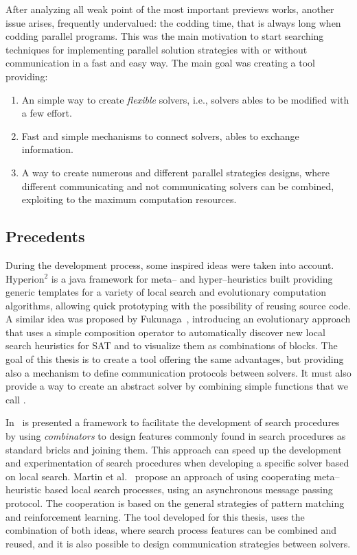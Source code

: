 After analyzing all weak point of the most important previews works, another issue arises, frequently undervalued: the codding time, that is always long when codding parallel programs. This was the main motivation to start searching techniques for implementing parallel solution strategies with or without communication in a fast and easy way. The main goal was creating a tool providing:
\begin{enumerate}
\item An simple way to create \textit{flexible} solvers, i.e., solvers ables to be modified with a few effort.
\item Fast and simple mechanisms to connect solvers, ables to exchange information.
\item A way to create numerous and different parallel strategies designs, where different communicating and not communicating solvers can be combined, exploiting to the maximum computation resources. 
\end{enumerate}

\subsection{Precedents}

During the development process, some inspired ideas were taken into account. {\sc Hyperion}$^2$ \cite{Brownlee2014} is a java framework for meta-- and hyper--heuristics built providing generic templates for a variety of local search and evolutionary computation algorithms, allowing quick prototyping with the possibility of reusing source code. A similar idea was proposed by Fukunaga~\cite{Fukunaga2008}, introducing an evolutionary approach that uses a simple composition operator to automatically discover new local search heuristics for SAT and to visualize them as combinations of blocks. The goal of this thesis is to create a tool offering the same advantages, but providing also a mechanism to define communication protocols between solvers. It must also provide a way to create an abstract solver by combining simple functions that we call \ms.  

In~\cite{Landtsheer2015} is presented a framework to facilitate the development of search procedures by using \textit{combinators} to design features commonly found in search procedures as standard bricks and joining them. This approach can speed up the development and experimentation of search procedures when developing a specific solver based on local search. Martin et al.~\cite{Martin2016} propose an approach of using cooperating meta--heuristic based local search processes, using an asynchronous message passing protocol. The cooperation is based on the general strategies of pattern matching and reinforcement learning. The tool developed for this thesis, uses the combination of both ideas, where search process features can be combined and reused, and it is also possible to design communication strategies between solvers.

